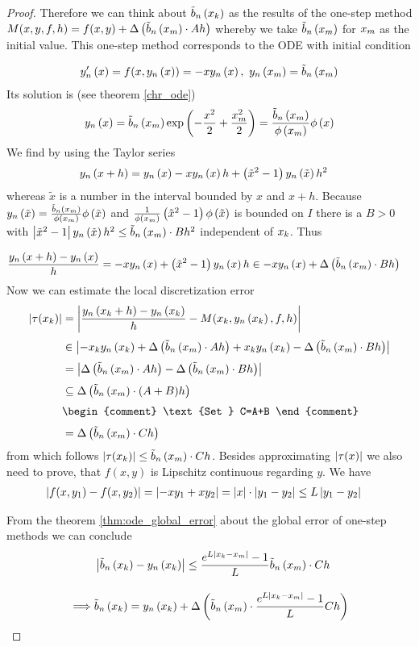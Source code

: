 \begin{proof}
  Therefore we can think about $\bb{\x}$ as the results of the one-step method $M(x,y,f,h)=f(x,y)+\bigabs{\bnp \cdot A h}$ whereby we take $\bnp$ for $\xnp$ as the initial value. This one-step method corresponds to the ODE with initial condition

  \begin{align}
    \dphin{x}=f(x,\phin{x})=-x\phin{x},\ \phin{\xnp} = \bb{\xnp}
  \end{align}
  Its solution is (see theorem \ref{chr_ode})
  \begin{align}
    \phin{x} = \bb{\xnp}\fexp{-\frac{x^2}2+\frac{\xnp^2}2} = \frac{\bb{\xnp}}{\fphi{\xnp}} \fphi{x}
  \end{align}
  We find by using the Taylor series
  \begin{align}
    & \phin{x+h} = \phin{x} -x\phin{x}h+\br{\tilde x^2-1}\phin{\tilde x} h^2
  \end{align}
  whereas $\tilde x$ is a number in the interval bounded by $x$ and $x+h$. Because $\phin{\tilde x} = \frac{\bnp}{\fphi{\xnp}} \fphi{\tilde x}$ and $\frac{1}{\fphi{\xnp}} \br{\tilde x^2-1} \fphi{\tilde x}$ is bounded on $I$ there is a $B > 0$ with $\abs{\tilde x^2-1} \phin{\tilde x} h^2 \le \bnp \cdot B h^2$ independent of $\x[k]$. Thus

  \begin{align}
    \frac{\phin{x+h}-\phin{x}}h &= -x\phin{x}+\br{\tilde x^2-1}\phin{x} h \in -x\phin{x} + \bigabs{\bnp \cdot Bh}
  \end{align}
  Now we can estimate the local discretization error
  \begin{align}
    \abs{\tau(\x)} &= \abs{\frac{\phin{\x[k]+h}-\phin{\x}}h -  M(\x,\phin{\x},f,h)} \nl
    &\in \abs{-\x\phin{\x} + \bigabs{\bnp \cdot Ah} +\x\phin{\x} - \bigabs{\bnp \cdot Bh}} \nl
    &= \abs{\bigabs{\bnp \cdot Ah}-\bigabs{\bnp \cdot Bh}} \nl
    &\subseteq \bigabs{\bnp \cdot (A+B)h} \nl
    &
    \begin{comment}
      \text{Set } C=A+B
    \end{comment} \nl
    &= \bigabs{\bnp \cdot Ch}
  \end{align}
  from which follows $\abs{\tau(\x)} \le \bnp \cdot Ch$. Besides approximating $\abs{\tau(x)}$ we also need to prove, that $f(x,y)$ is Lipschitz continuous regarding $y$. We have
  \begin{align}
    \abs{f(x,y_1)-f(x,y_2)} &= \abs{-xy_1+xy_2} = \abs{x} \cdot \abs{y_1-y_2} \le L \abs{y_1-y_2}
  \end{align}

  \noindent From the theorem \ref{thm:ode_global_error} about the global error of one-step methods we can conclude
  \begin{align}
    & \abs{\bb{\x}-\phin{\x}} \le \frac{\fe{L\abs{\x-\xnp}}-1}L \bnp \cdot Ch \bnl
    \implies & \bb{\x} = \phin{\x} + \bigabs{\bnp \cdot \frac{\fe{L\abs{\x-\xnp}}-1}L Ch}
  \end{align}
\end{proof}

